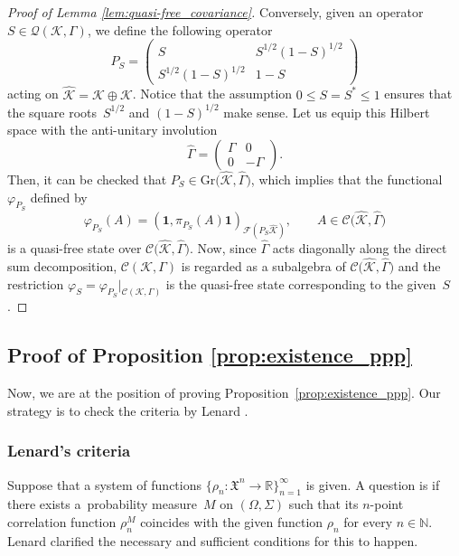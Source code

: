 \documentclass[pdftex]{sigma}
\numberwithin{equation}{section}
\newcommand{\mfrak}[1]{\mathfrak{#1}}
\newcommand{\mcal}[1]{\mathcal{#1}}
\newcommand{\mbb}[1]{\mathbb{#1}}
\newcommand{\mrm}[1]{\mathrm{#1}}
\newcommand{\what}[1]{\widehat{#1}}
\begin{document}
\begin{proof}[Proof of Lemma \ref{lem:quasi-free_covariance}]
Conversely, given an operator $S\in\mcal{Q}(\mcal{K},\Gamma)$, we define the following operator
\begin{equation*}
	P_{S}=\left(
	\begin{matrix}
	S & S^{1/2}(1-S)^{1/2} \\
	S^{1/2}(1-S)^{1/2} & 1-S
	\end{matrix}
	\right)
\end{equation*}
acting on $\what{\mcal{K}}=\mcal{K}\oplus\mcal{K}$. Notice that the assumption $0\le S=S^{\ast}\le 1$ ensures that the square roots~$S^{1/2}$ and $(1-S)^{1/2}$ make sense. Let us equip this Hilbert space with the anti-unitary involution
\begin{equation*}
	\what{\Gamma}=\left(
	\begin{matrix}
	\Gamma & 0 \\
	0 & -\Gamma
	\end{matrix}
	\right).
\end{equation*}
Then, it can be checked that $P_{S}\in \mrm{Gr}\big(\what{\mcal{K}},\what{\Gamma}\big)$, which implies that the functional $\varphi_{P_{S}}$ defined by
\begin{equation*}
	\varphi_{P_{S}}(A)= (\bm{1},\pi_{P_{S}}(A)\bm{1} )_{\mcal{F}(P_{S}\what{\mcal{K}})},\qquad A\in \mcal{C}\big(\what{\mcal{K}},\what{\Gamma}\big)
\end{equation*}
is a quasi-free state over $\mcal{C}\big(\what{\mcal{K}},\what{\Gamma}\big)$. Now, since $\what{\Gamma}$ acts diagonally along the direct sum decomposition, $\mcal{C}(\mcal{K},\Gamma)$ is regarded as a subalgebra of $\mcal{C}\big(\what{\mcal{K}},\what{\Gamma}\big)$ and the restriction $\varphi_{S}=\varphi_{P_{S}}|_{\mcal{C}(\mcal{K},\Gamma)}$ is the quasi-free state corresponding to the given~$S$.
\end{proof}

\subsection{Proof of Proposition \ref{prop:existence_ppp}}
Now, we are at the position of proving Proposition~\ref{prop:existence_ppp}.
Our strategy is to check the criteria by Lenard \cite{Lenard1975a, Lenard1975b}.

\subsubsection{Lenard's criteria}
Suppose that a system of functions $\big\{\rho_{n}\colon\mfrak{X}^{n}\to\mbb{R}\big\}_{n=1}^{\infty}$ is given.
A question is if there exists a~probability measure~$M$ on $(\Omega,\Sigma)$ such that its $n$-point correlation function $\rho^{M}_{n}$ coincides with the given function $\rho_{n}$ for every $n\in\mbb{N}$.
Lenard \cite{Lenard1975a, Lenard1975b} clarified the necessary and sufficient conditions for this to happen.
\end{document}

